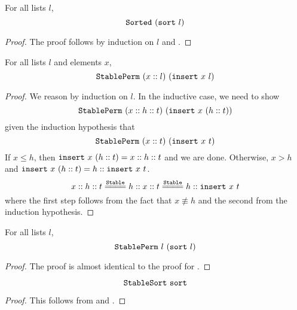 \documentclass[sigplan,10pt,anonymous,review]{thesis}
\begin{document}
\begin{theorem}
  For all lists $l$,
  \begin{equation*}
    \texttt{Sorted}~(\texttt{sort}~l)
  \end{equation*}
\end{theorem}
\begin{proof}
  The proof follows by induction on $l$ and .
\end{proof}

\begin{lemma}
  For all lists $l$ and elements $x$,
  \begin{equation*}
    \texttt{StablePerm}~(x::l)~(\texttt{insert}~x~l)
  \end{equation*}
\end{lemma}
\begin{proof}
  We reason by induction on $l$. In the inductive case, we need to show
  \begin{equation*}
    \texttt{StablePerm}~(x::h::t)~(\texttt{insert}~x~(h::t))
  \end{equation*}
  given the induction hypothesis that
  \begin{equation*}
    \texttt{StablePerm}~(x::t)~(\texttt{insert}~x~t)
  \end{equation*}
  If $x \le h$, then $\texttt{insert}~x~(h::t) = x :: h :: t$ and we are
  done. Otherwise, $x > h$ and $\texttt{insert}~x~(h::t) = h ::
  \texttt{insert}~x~t$.
  \begin{equation*}
    x :: h :: t \eqstable h :: x :: t \eqstable h :: \var{insert}~x~t
  \end{equation*}
  where the first step follows from the fact that $x \not\equiv h$ and the
  second from the induction hypothesis.
\end{proof}

\begin{theorem}
  For all lists $l$,
  \begin{equation*}
    \texttt{StablePerm}~l~(\texttt{sort}~l)
  \end{equation*}
\end{theorem}
\begin{proof}
  The proof is almost identical to the proof for .
\end{proof}

\begin{theorem}
  \begin{equation*}
    \texttt{StableSort}~\texttt{sort}
  \end{equation*}
\end{theorem}
\begin{proof}
  This follows from  and .
\end{proof}
\end{document}
